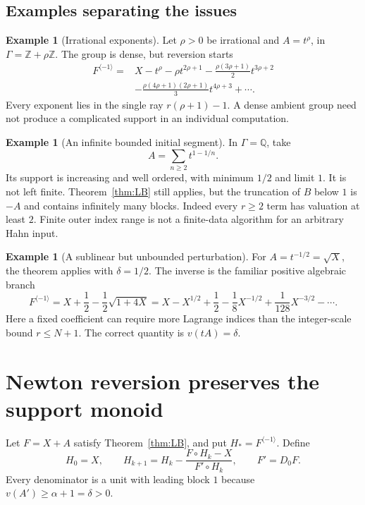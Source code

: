 \documentclass[11pt,a4paper]{article}
\theoremstyle{definition}
\newtheorem{example}[theorem]{Example}
\theoremstyle{remark}
\newcommand{\Q}{\mathbb Q}
\newcommand{\Z}{\mathbb Z}
\newcommand{\rev}{^{\langle-1\rangle}}
\begin{document}
\subsection{Examples separating the issues}
\begin{example}[Irrational exponents]
Let $\rho>0$ be irrational and $A=t^\rho$, in
$\Gamma=\Z+\rho\Z$. The group is dense, but reversion starts
\begin{align*}
 F\rev={}&X-t^\rho-\rho t^{2\rho+1}
 -\frac{\rho(3\rho+1)}2t^{3\rho+2}\\
 &-\frac{\rho(4\rho+1)(2\rho+1)}3t^{4\rho+3}+\cdots.
\end{align*}
Every exponent lies in the single ray $r(\rho+1)-1$. A dense ambient group
need not produce a complicated support in an individual computation.
\end{example}

\begin{example}[An infinite bounded initial segment]
In $\Gamma=\Q$, take
\[
 A=\sum_{n\ge2}t^{1-1/n}.
\]
Its support is increasing and well ordered, with minimum $1/2$ and limit
$1$. It is not left finite. Theorem~\ref{thm:LB} still applies, but the
truncation of $B$ below $1$ is $-A$ and contains infinitely many blocks.
Indeed every $r\ge2$ term has valuation at least $2$. Finite outer index
range is not a finite-data algorithm for an arbitrary Hahn input.
\end{example}

\begin{example}[A sublinear but unbounded perturbation]
For $A=t^{-1/2}=\sqrt X$, the theorem applies with $\delta=1/2$. The inverse
is the familiar positive algebraic branch
\[
 F\rev=X+\frac12-\frac12\sqrt{1+4X}
 =X-X^{1/2}+\frac12-\frac18X^{-1/2}
   +\frac1{128}X^{-3/2}-\cdots.
\]
Here a fixed coefficient can require more Lagrange indices than the
integer-scale bound $r\le N+1$. The correct quantity is $v(tA)=\delta$.
\end{example}

\section{Newton reversion preserves the support monoid}
\label{sec:newton}

Let $F=X+A$ satisfy Theorem~\ref{thm:LB}, and put $H_*=F\rev$. Define
\begin{equation}\label{eq:newton}
 H_0=X,\qquad
 H_{k+1}=H_k-\frac{F\circ H_k-X}{F'\circ H_k},\qquad F'=D_0F.
\end{equation}
Every denominator is a unit with leading block $1$ because
$v(A')\ge\alpha+1=\delta>0$.
\end{document}
